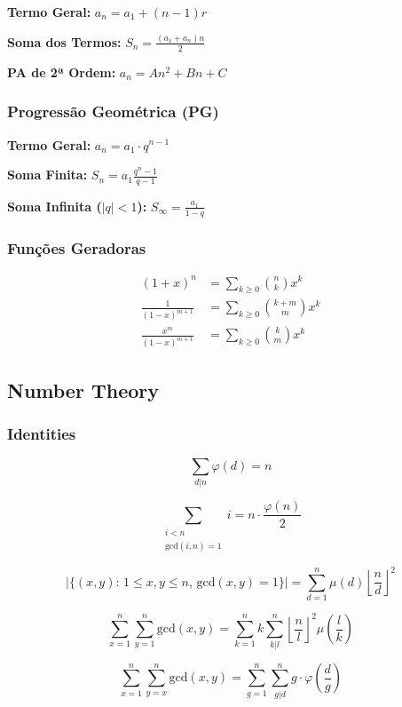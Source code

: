 \textbf{Termo Geral:} \quad $ a_n = a_1 + (n-1)r $

\textbf{Soma dos Termos:} \quad $ S_n = \frac{(a_1 + a_n)n}{2} $

\textbf{PA de 2ª Ordem:} \quad $ a_n = An^2 + Bn + C $

\subsubsection{Progressão Geométrica (PG)}

\textbf{Termo Geral:} \quad $ a_n = a_1 \cdot q^{n-1} $

\textbf{Soma Finita:} \quad $ S_n = a_1 \frac{q^n - 1}{q - 1} $

\textbf{Soma Infinita ($|q|<1$):} \quad $ S_{\infty} = \frac{a_1}{1 - q} $


\subsubsection{Funções Geradoras}

\begin{align*}
    (1+x)^n &= \sum_{k\ge 0} \binom{n}{k} x^k \\[6pt]
    \frac{1}{(1-x)^{m+1}} &= \sum_{k\ge 0} \binom{k+m}{m} x^k \\[6pt]
    \frac{x^m}{(1-x)^{m+1}} &= \sum_{k\ge 0} \binom{k}{m} x^k
\end{align*}

\subsection{Number Theory}

\subsubsection{Identities}

$$ \sum_{d|n} \varphi(d) = n$$

$$ \sum_{\substack{i < n \\ \text{gcd}(i, n) = 1}} i = n \cdot \frac{\varphi(n)}{2} $$

$$ |\{(x, y) : \, 1 \leq x, y \leq n, \, \text{gcd}(x, y) = 1\}| = \sum_{d = 1}^n \mu(d) \left \lfloor \frac{n}{d} \right \rfloor^2$$

$$\sum_{x = 1}^n \sum_{y = 1}^n \text{gcd}(x, y)
= \sum_{k = 1}^n k \sum_{k|l}^{n} \left \lfloor \frac{n}{l} \right \rfloor^2 \mu\left(\frac{l}{k}\right)$$

$$\sum_{x = 1}^n \sum_{y = x}^n \text{gcd}(x, y) = \sum_{g = 1}^n \sum_{g|d}^n g \cdot \varphi\left(\frac{d}{g}\right)$$

